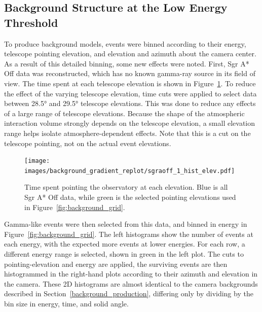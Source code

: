   \subsection{Background Structure at the Low Energy Threshold}\label{subsec:bkgstructure}
    To produce background models, events were binned according to their energy, telescope pointing elevation, and elevation and azimuth about the camera center.
    As a result of this detailed binning, some new effects were noted.
    First, Sgr A* Off data was reconstructed, which has no known gamma-ray source in its field of view.
    The time spent at each telescope elevation is shown in Figure~\ref{fig:back_elevhist}.
    To reduce the effect of the varying telescope elevation, time cuts were applied to select data between \ang{28.5} and \ang{29.5} telescope elevations.
    This was done to reduce any effects of a large range of telescope elevations.
    Because the shape of the atmospheric interaction volume strongly depends on the telescope elevation, a small elevation range helps isolate atmosphere-dependent effects.
    Note that this is a cut on the telescope pointing, not on the actual event elevations.

    \begin{figure}[bt]
      \centering
      \texttt{[image: images/background\_gradient\_replot/sgraoff\_1\_hist\_elev.pdf]}
      \caption[Elevation Slice of Sgr A* Off data]{
        Time spent pointing the observatory at each elevation.
        Blue is all Sgr A* Off data, while green is the selected pointing elevations used in Figure~\ref{fig:background_grid}.
      }
      \label{fig:back_elevhist}
    \end{figure}
    
    Gamma-like events were then selected from this data, and binned in energy in Figure~\ref{fig:background_grid}.
    The left histograms show the number of events at each energy, with the expected more events at lower energies.
    For each row, a different energy range is selected, shown in green in the left plot.
    The cuts to pointing-elevation  and energy are applied, the surviving events are then histogrammed in the right-hand plots according to their azimuth and elevation in the camera.
    These 2D histograms are almost identical to the camera backgrounds described in Section~\ref{background_production}, differing only by dividing by the bin size in energy, time, and solid angle.
    
